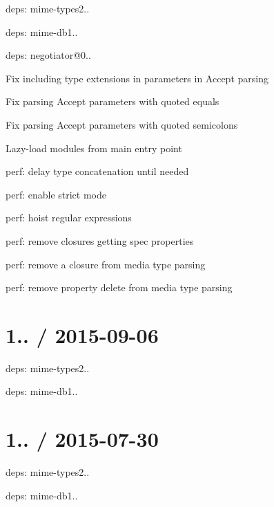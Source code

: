 \begin{DoxyItemize}
\item deps\+: mime-\/types2..
\begin{DoxyItemize}
\item deps\+: mime-\/db1..
\end{DoxyItemize}
\item deps\+: negotiator@0..
\begin{DoxyItemize}
\item Fix including type extensions in parameters in {\ttfamily Accept} parsing
\item Fix parsing {\ttfamily Accept} parameters with quoted equals
\item Fix parsing {\ttfamily Accept} parameters with quoted semicolons
\item Lazy-\/load modules from main entry point
\item perf\+: delay type concatenation until needed
\item perf\+: enable strict mode
\item perf\+: hoist regular expressions
\item perf\+: remove closures getting spec properties
\item perf\+: remove a closure from media type parsing
\item perf\+: remove property delete from media type parsing
\end{DoxyItemize}
\end{DoxyItemize}

\section*{1.. / 2015-\/09-\/06 }


\begin{DoxyItemize}
\item deps\+: mime-\/types2..
\begin{DoxyItemize}
\item deps\+: mime-\/db1..
\end{DoxyItemize}
\end{DoxyItemize}

\section*{1.. / 2015-\/07-\/30 }


\begin{DoxyItemize}
\item deps\+: mime-\/types2..
\begin{DoxyItemize}
\item deps\+: mime-\/db1..
\end{DoxyItemize}
\end{DoxyItemize}

